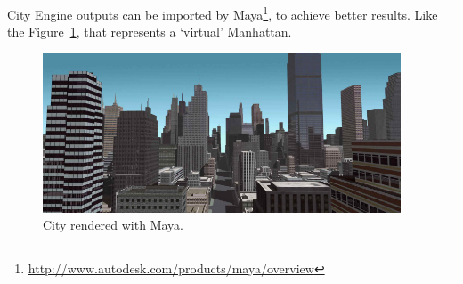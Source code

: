City Engine outputs can be imported by Maya\footnote{\url{http://www.autodesk.com/products/maya/overview}}, to achieve better results. Like the Figure~\ref{fig:cityMaya}, that represents a ‘virtual’ Manhattan.

\begin{figure}[htbp]
  \centering
  \includegraphics[width=0.95\textwidth]{img/Procedural-Modeling-of-Cities/City_Maya.png}
  \caption{City rendered with Maya.}
  \label{fig:cityMaya}
\end{figure}

